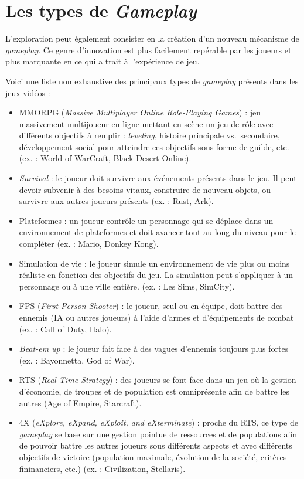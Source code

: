 \section{Les types de \emph{Gameplay}}
L'exploration peut également consister en la création d'un nouveau mécanisme de \emph{gameplay}. Ce genre d'innovation est plus facilement repérable par les joueurs et plus marquante en ce qui a trait \`a l'expérience de jeu. 

Voici une liste non exhaustive des principaux types de \emph{gameplay} présents dans les jeux vidéos :
\begin{itemize}
    \item MMORPG (\emph{Massive Multiplayer Online Role-Playing Games}) : jeu massivement multijoueur en ligne mettant en scène un jeu de rôle avec différents objectifs à remplir : \emph{leveling}, histoire principale vs.\ secondaire, développement social pour atteindre ces objectifs sous forme de guilde, etc. (ex. : World of WarCraft, Black Desert Online).
    \item \emph{Survival} : le joueur doit survivre aux événements présents dans le jeu. Il peut devoir subvenir à des besoins vitaux, construire de nouveau objets, ou survivre aux autres joueurs présents (ex. : Rust, Ark).
    \item Plateformes : un joueur contrôle un personnage qui se déplace dans un environnement de plateformes et doit avancer tout au long du niveau pour le compl\'eter (ex. : Mario, Donkey Kong).
    \item Simulation de vie : le joueur simule un environnement de vie plus ou moins réaliste en fonction des objectifs du jeu. La simulation peut s'appliquer à un personnage ou à une ville entière. (ex. : Les Sims, SimCity).
    \item FPS (\emph{First Person Shooter}) : le joueur, seul ou en équipe, doit battre des ennemis (IA ou autres joueurs) à l'aide d'armes et d'équipements de combat (ex. : Call of Duty, Halo).
    \item \emph{Beat-em up} : le joueur fait face à des vagues d'ennemis toujours plus fortes (ex. : Bayonnetta, God of War).
    \item RTS (\emph{Real Time Strategy}) : des joueurs se font face dans un jeu o\`u la gestion d'économie, de troupes et de population est omniprésente afin de battre les autres (Age of Empire, Starcraft).
    \item 4X (\emph{eXplore, eXpand, eXploit, and eXterminate}) : proche du RTS, ce type de \emph{gameplay} se base sur une gestion pointue de ressources et de populations afin de pouvoir battre les autres joueurs sous différents aspects et avec différents objectifs de victoire (population maximale, évolution de la société, critères fininanciers, etc.) (ex. : Civilization, Stellaris).

\end{itemize}
